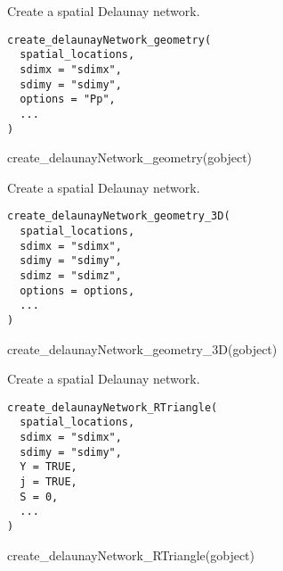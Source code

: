 \documentclass[a4paper]{book}
\begin{document}
%
\begin{Description}\relax
Create a spatial Delaunay network.
\end{Description}
%
\begin{Usage}
\begin{verbatim}
create_delaunayNetwork_geometry(
  spatial_locations,
  sdimx = "sdimx",
  sdimy = "sdimy",
  options = "Pp",
  ...
)
\end{verbatim}
\end{Usage}
%
\begin{Examples}
\begin{ExampleCode}
    create_delaunayNetwork_geometry(gobject)
\end{ExampleCode}
\end{Examples}
%
\begin{Description}\relax
Create a spatial Delaunay network.
\end{Description}
%
\begin{Usage}
\begin{verbatim}
create_delaunayNetwork_geometry_3D(
  spatial_locations,
  sdimx = "sdimx",
  sdimy = "sdimy",
  sdimz = "sdimz",
  options = options,
  ...
)
\end{verbatim}
\end{Usage}
%
\begin{Examples}
\begin{ExampleCode}
    create_delaunayNetwork_geometry_3D(gobject)
\end{ExampleCode}
\end{Examples}
%
\begin{Description}\relax
Create a spatial Delaunay network.
\end{Description}
%
\begin{Usage}
\begin{verbatim}
create_delaunayNetwork_RTriangle(
  spatial_locations,
  sdimx = "sdimx",
  sdimy = "sdimy",
  Y = TRUE,
  j = TRUE,
  S = 0,
  ...
)
\end{verbatim}
\end{Usage}
%
\begin{Examples}
\begin{ExampleCode}
    create_delaunayNetwork_RTriangle(gobject)
\end{ExampleCode}
\end{Examples}
\end{document}
